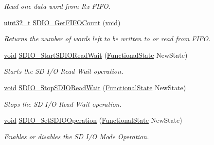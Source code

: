 \begin{DoxyCompactItemize}
\begin{DoxyCompactList}\small\item\em Read one data word from Rx F\+I\+FO. \end{DoxyCompactList}\item 
\hyperlink{_p_e___types_8h_a33594304e786b158f3fb30289278f5af}{uint32\+\_\+t} \hyperlink{group___s_d_i_o___exported___functions_ga9a3343983a2d68b5164a1c89797d2dd6}{S\+D\+I\+O\+\_\+\+Get\+F\+I\+F\+O\+Count} (\hyperlink{usb__devapi_8h_afabf60e7f57651d6d595a02c75f07cd0}{void})
\begin{DoxyCompactList}\small\item\em Returns the number of words left to be written to or read from F\+I\+FO. \end{DoxyCompactList}\item 
\hyperlink{usb__devapi_8h_afabf60e7f57651d6d595a02c75f07cd0}{void} \hyperlink{group___s_d_i_o___exported___functions_gac88f914d9a68a83abc2265ec8a7b79fc}{S\+D\+I\+O\+\_\+\+Start\+S\+D\+I\+O\+Read\+Wait} (\hyperlink{agilefox_2library_2inc_2stm32f10x__type_8h_ac9a7e9a35d2513ec15c3b537aaa4fba1}{Functional\+State} New\+State)
\begin{DoxyCompactList}\small\item\em Starts the SD I/O Read Wait operation. \end{DoxyCompactList}\item 
\hyperlink{usb__devapi_8h_afabf60e7f57651d6d595a02c75f07cd0}{void} \hyperlink{group___s_d_i_o___exported___functions_gaca6b25eb2debb73ac827c66f0ebcf837}{S\+D\+I\+O\+\_\+\+Stop\+S\+D\+I\+O\+Read\+Wait} (\hyperlink{agilefox_2library_2inc_2stm32f10x__type_8h_ac9a7e9a35d2513ec15c3b537aaa4fba1}{Functional\+State} New\+State)
\begin{DoxyCompactList}\small\item\em Stops the SD I/O Read Wait operation. \end{DoxyCompactList}\item 
\hyperlink{usb__devapi_8h_afabf60e7f57651d6d595a02c75f07cd0}{void} \hyperlink{group___s_d_i_o___exported___functions_ga24e210c185d5a7855cbaff4472a8f8d1}{S\+D\+I\+O\+\_\+\+Set\+S\+D\+I\+O\+Operation} (\hyperlink{agilefox_2library_2inc_2stm32f10x__type_8h_ac9a7e9a35d2513ec15c3b537aaa4fba1}{Functional\+State} New\+State)
\begin{DoxyCompactList}\small\item\em Enables or disables the SD I/O Mode Operation. \end{DoxyCompactList}\item 

\end{DoxyCompactItemize}
